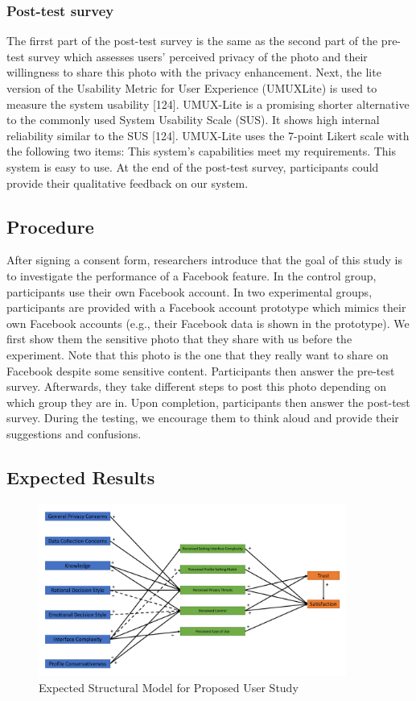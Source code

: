 \subsubsection{Post-test survey}
The firrst part of the post-test survey is the same as the second part of the pre-test survey
which assesses users' perceived privacy of the photo and their willingness to share this photo with
the privacy enhancement. Next, the lite version of the Usability Metric for User Experience (UMUXLite)
is used to measure the system usability [124]. UMUX-Lite is a promising shorter alternative
to the commonly used System Usability Scale (SUS). It shows high internal reliability similar to the
SUS [124]. UMUX-Lite uses the 7-point Likert scale with the following two items:
This system's capabilities meet my requirements.
This system is easy to use.
At the end of the post-test survey, participants could provide their qualitative feedback on
our system.


\subsection{Procedure}
After signing a consent form, researchers introduce that the goal of this study is to investigate
the performance of a Facebook feature. In the control group, participants use their own Facebook
account. In two experimental groups, participants are provided with a Facebook account prototype
which mimics their own Facebook accounts (e.g., their Facebook data is shown in the prototype).
We first show them the sensitive photo that they share with us before the experiment. Note that
this photo is the one that they really want to share on Facebook despite some sensitive content.
Participants then answer the pre-test survey. Afterwards, they take different steps to post this photo
depending on which group they are in. Upon completion, participants then answer the post-test
survey. During the testing, we encourage them to think aloud and provide their suggestions and
confusions.

\subsection{Expected Results}

\begin{figure}
	\centering
	\includegraphics[width=0.9\textwidth]{figures/uimodel.pdf}
	\caption{Expected Structural Model for Proposed User Study}
	\label{fig:uimodel}
\end{figure}

